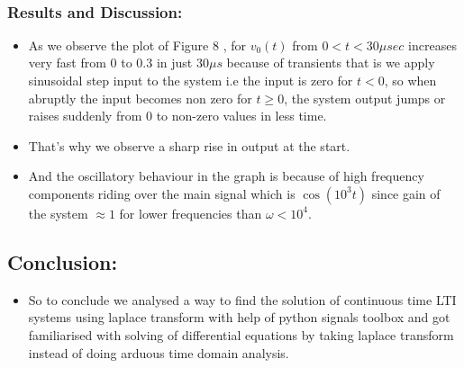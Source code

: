 \documentclass[10pt,a4paper]{article}
\providecommand{\tightlist}{%
      \setlength{\itemsep}{0pt}\setlength{\parskip}{0pt}}
\begin{document}
    \begin{center}
    \end{center}
    { \hspace*{\fill} \\}
    
    \subsubsection{Results and Discussion:}\label{results-and-discussion}

\begin{itemize}
\tightlist
\item
  As we observe the plot of Figure 8 , for \(v_0(t)\) from
  \(0<t<30\mu sec\) increases very fast from 0 to 0.3 in just
  \(30\mu s\) because of transients that is we apply sinusoidal step
  input to the system i.e the input is zero for \(t<0\), so when
  abruptly the input becomes non zero for \(t \geq 0\), the system
  output jumps or raises suddenly from 0 to non-zero values in less
  time.
\item
  That's why we observe a sharp rise in output at the start.
\item
  And the oscillatory behaviour in the graph is because of high
  frequency components riding over the main signal which is
  \(\cos(10^{3}t)\) since gain of the system \(\approx 1\) for lower
  frequencies than \(\omega < 10^4\).
\end{itemize}

    \subsection{Conclusion:}\label{conclusion}

\begin{itemize}
\tightlist
\item
  So to conclude we analysed a way to find the solution of continuous
  time LTI systems using laplace transform with help of python signals
  toolbox and got familiarised with solving of differential equations by
  taking laplace transform instead of doing arduous time domain
  analysis.
\end{itemize}


    
    
    
    
\end{document}
